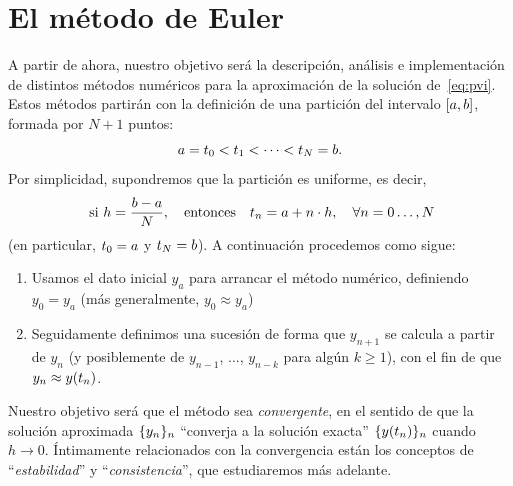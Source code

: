 \section{El método de Euler}

A partir de ahora, nuestro objetivo será la descripción, análisis e
implementación de distintos métodos numéricos para la aproximación de
la solución de~\eqref{eq:pvi}. Estos métodos partirán con la
definición de una partición del intervalo $[\ta,\tb]$, formada por
$N+1$ puntos:
\begin{equation*}
  \ta=\tt_0 < \tt_1 < \cdots < \tt_N=\tb.
\end{equation*}
Por simplicidad, supondremos que la partición es uniforme, es decir,
\begin{equation*}
  \text{ si } h=\frac{b-a}{N}, \quad \text{entonces} \quad
  \tt_n=\ta+n\cdot h,\quad \forall n=0\dots,N
\end{equation*}
(en particular, $\tt_0=a$ y $\tt_N=b$). A continuación procedemos como
sigue:
\begin{enumerate}
\item Usamos el dato inicial $y_a$ para arrancar el método numérico,
  definiendo $y_0=y_a$ (más generalmente, $y_0\approx y_a$)
\item Seguidamente definimos una sucesión de forma que $y_{n+1}$ se
  calcula a partir de $y_n$ (y posiblemente de $y_{n-1}$, ...,
  $y_{n-k}$ para algún $k\ge 1$), con el fin de que
  $y_n\approx\sol(\tn)$. 
\end{enumerate}
Nuestro objetivo será que el método sea \textit{convergente}, en el
sentido de que la solución aproximada $\{\yn\}_n$ ``converja a la
solución exacta'' $\{\sol(\tn)\}_n$ cuando $h\to 0$. Íntimamente
relacionados con la convergencia están los conceptos de
``\textit{estabilidad}'' y ``\textit{consistencia}'', que estudiaremos
más adelante.

